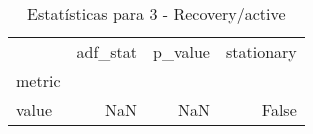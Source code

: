 \begin{table}[htbp]
\caption{Estatísticas para 3 - Recovery/active}
\label{tab:3_-_recovery_active_adf_test}
\begin{tabular}{lrrr}
\toprule
 & adf_stat & p_value & stationary \\
metric &  &  &  \\
\midrule
value & NaN & NaN & False \\
\bottomrule
\end{tabular}
\end{table}

